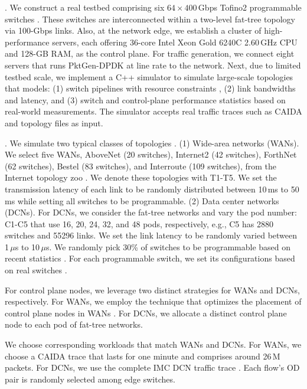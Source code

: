 . We construct a real testbed comprising six \(64 \times 400\)\,Gbps Tofino2 programmable switches \cite{tofino2}. These switches are interconnected within a two-level fat-tree topology via 100-Gbps links. Also, at the network edge, we establish a cluster of high-performance servers, each offering 36-core Intel Xeon Gold 6240C 2.60\,GHz CPU and 128-GB RAM, as the control plane. For traffic generation, we connect eight servers that runs PktGen-DPDK \cite{pktgen} at line rate to the network. Next, due to limited testbed scale, we implement a C++ simulator to simulate large-scale topologies that models: (1) switch pipelines with resource constraints \cite{jose2015compiling}, (2) link bandwidths and latency, and (3) switch and control-plane performance statistics based on real-world measurements. The simulator accepts real traffic traces such as CAIDA \cite{caida} and topology files as input.

. We simulate two typical classes of topologies \cite{anup2022hetero,chen2024eagle}. (1) Wide-area networks (WANs). We select five WANs, AboveNet (20 switches), Internet2 (42 switches), ForthNet (62 switches), Bestel (83 switches), and Interroute (109 switches), from the Internet topology zoo \cite{knight2011internet}. We denote these topologies with T1-T5. We set the transmission latency of each link to be randomly distributed between 10\,ms to 50\,ms while setting all switches to be programmable. (2) Data center networks (DCNs). For DCNs, we consider the fat-tree networks and vary the pod number: C1-C5 that use 16, 20, 24, 32, and 48 pods, respectively, e.g., C5 has 2880 switches and 55296 links. We set the link latency to be randomly varied between 1\,$\mu$s to 10\,$\mu$s. We randomly pick 30\% of switches to be programmable based on recent statistics \cite{telecom}. For each programmable switch, we set its configurations based on real switches \cite{jose2015compiling}.

For control plane nodes, we leverage two distinct strategies for WANs and DCNs, respectively. For WANs, we employ the technique that optimizes the placement of control plane nodes in WANs \cite{heller2012controller}. For DCNs, we allocate a distinct control plane node to each pod of fat-tree networks. 

We choose corresponding workloads that match WANs and DCNs. For WANs, we choose a CAIDA trace \cite{caida} that lasts for one minute and comprises around 26\,M packets. For DCNs, we use the complete IMC DCN traffic trace \cite{benson2010network}. Each flow's OD pair is randomly selected among edge switches. 

